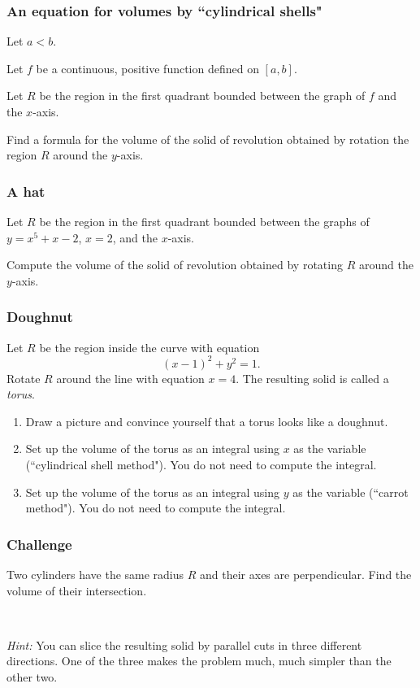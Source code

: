 \documentclass[14pt]{beamer}
\newcommand {\DS} [1] {${\displaystyle #1}$}
\newcommand{\setsize}[1]{\fontsize{#1}{#1}\selectfont} %
\newcommand{\smallerfont}{\setsize{13}} %
\begin{document}
\begin{frame}[t]
\frametitle{An equation for volumes by ``cylindrical shells"}

Let $a < b$.

Let $f$ be a continuous, positive function defined on $[a,b]$.

Let $R$ be the region in the first quadrant bounded between the graph of $f$ and the $x$-axis.

Find a formula for the volume of the solid of revolution obtained by rotation the region $R$ around the $y$-axis.

\end{frame}
\begin{frame}[t]
\frametitle{A hat}

Let $R$ be the region in the first quadrant bounded between the graphs of \DS{y=x^5+x-2}, \DS{x=2}, and the \DS{x}-axis.  

Compute the volume of the solid of revolution obtained by rotating $R$ around the $y$-axis.

\end{frame}
\begin{frame}[t]
\smallerfont
\frametitle{Doughnut}

Let $R$ be the region inside the curve with equation
	$$
		(x-1)^2 + y^2=1.
	$$
Rotate $R$ around the line with equation \DS{x=4}.  The resulting solid is called a \emph{torus}.

\begin{enumerate}
	\item  Draw a picture and convince yourself that a torus looks like a doughnut.
	\item  Set up the volume of the torus as an integral using $x$ as the variable (``cylindrical shell method").  You do not need to compute the integral. 
	\item  Set up the volume of the torus as an integral using $y$ as the variable (``carrot method").  You do not need to compute the integral. 
\end{enumerate}

\end{frame}
\begin{frame}[t]
\frametitle{Challenge}

Two cylinders have the same radius $R$ and their axes are perpendicular.  Find the volume of their intersection.

\

\emph{Hint:}  You can slice the resulting solid by parallel cuts in three different directions.  One of the three makes the problem much, much simpler than the other two.

\end{frame}
\end{document}
